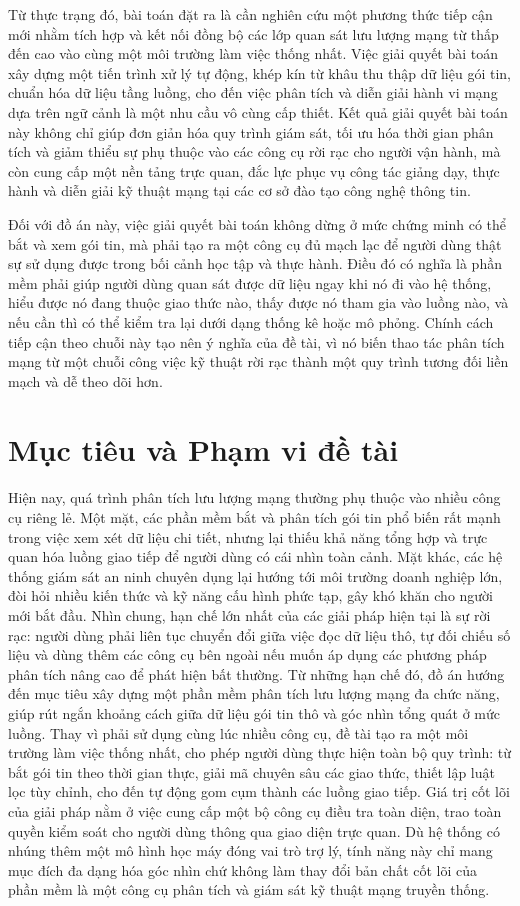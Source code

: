 \documentclass[../DoAn.tex]{subfiles}
\begin{document}
Từ thực trạng đó, bài toán đặt ra là cần nghiên cứu một phương thức tiếp cận mới nhằm tích hợp và kết nối đồng bộ các lớp quan sát lưu lượng mạng từ thấp đến cao vào cùng một môi trường làm việc thống nhất. Việc giải quyết bài toán xây dựng một tiến trình xử lý tự động, khép kín từ khâu thu thập dữ liệu gói tin, chuẩn hóa dữ liệu tầng luồng, cho đến việc phân tích và diễn giải hành vi mạng dựa trên ngữ cảnh là một nhu cầu vô cùng cấp thiết. Kết quả giải quyết bài toán này không chỉ giúp đơn giản hóa quy trình giám sát, tối ưu hóa thời gian phân tích và giảm thiểu sự phụ thuộc vào các công cụ rời rạc cho người vận hành, mà còn cung cấp một nền tảng trực quan, đắc lực phục vụ công tác giảng dạy, thực hành và diễn giải kỹ thuật mạng tại các cơ sở đào tạo công nghệ thông tin.

Đối với đồ án này, việc giải quyết bài toán không dừng ở mức chứng minh có thể bắt và xem gói tin, mà phải tạo ra một công cụ đủ mạch lạc để người dùng thật sự sử dụng được trong bối cảnh học tập và thực hành. Điều đó có nghĩa là phần mềm phải giúp người dùng quan sát được dữ liệu ngay khi nó đi vào hệ thống, hiểu được nó đang thuộc giao thức nào, thấy được nó tham gia vào luồng nào, và nếu cần thì có thể kiểm tra lại dưới dạng thống kê hoặc mô phỏng. Chính cách tiếp cận theo chuỗi này tạo nên ý nghĩa của đề tài, vì nó biến thao tác phân tích mạng từ một chuỗi công việc kỹ thuật rời rạc thành một quy trình tương đối liền mạch và dễ theo dõi hơn.

\section{Mục tiêu và Phạm vi đề tài}
Hiện nay, quá trình phân tích lưu lượng mạng thường phụ thuộc vào nhiều công cụ riêng lẻ. Một mặt, các phần mềm bắt và phân tích gói tin phổ biến rất mạnh trong việc xem xét dữ liệu chi tiết, nhưng lại thiếu khả năng tổng hợp và trực quan hóa luồng giao tiếp để người dùng có cái nhìn toàn cảnh. Mặt khác, các hệ thống giám sát an ninh chuyên dụng lại hướng tới môi trường doanh nghiệp lớn, đòi hỏi nhiều kiến thức và kỹ năng cấu hình phức tạp, gây khó khăn cho người mới bắt đầu. Nhìn chung, hạn chế lớn nhất của các giải pháp hiện tại là sự rời rạc: người dùng phải liên tục chuyển đổi giữa việc đọc dữ liệu thô, tự đối chiếu số liệu và dùng thêm các công cụ bên ngoài nếu muốn áp dụng các phương pháp phân tích nâng cao để phát hiện bất thường.
Từ những hạn chế đó, đồ án hướng đến mục tiêu xây dựng một phần mềm phân tích lưu lượng mạng đa chức năng, giúp rút ngắn khoảng cách giữa dữ liệu gói tin thô và góc nhìn tổng quát ở mức luồng. Thay vì phải sử dụng cùng lúc nhiều công cụ, đề tài tạo ra một môi trường làm việc thống nhất, cho phép người dùng thực hiện toàn bộ quy trình: từ bắt gói tin theo thời gian thực, giải mã chuyên sâu các giao thức, thiết lập luật lọc tùy chỉnh, cho đến tự động gom cụm thành các luồng giao tiếp. Giá trị cốt lõi của giải pháp nằm ở việc cung cấp một bộ công cụ điều tra toàn diện, trao toàn quyền kiểm soát cho người dùng thông qua giao diện trực quan. Dù hệ thống có nhúng thêm một mô hình học máy đóng vai trò trợ lý, tính năng này chỉ mang mục đích đa dạng hóa góc nhìn chứ không làm thay đổi bản chất cốt lõi của phần mềm là một công cụ phân tích và giám sát kỹ thuật mạng truyền thống.
\end{document}
